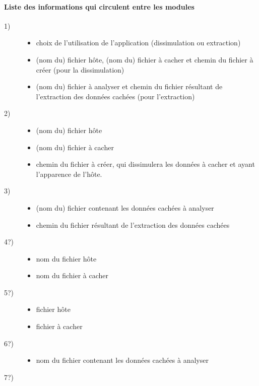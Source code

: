 \documentclass[11pt]{article}
\begin{document}
\paragraph{Liste des informations qui circulent entre les modules}
\begin{description}
\item[1)] 
\begin{itemize}
\item choix de l'utilisation de l'application (dissimulation ou extraction)
\item (nom du) fichier hôte, (nom du) fichier à cacher et chemin du fichier à créer (pour la dissimulation)
\item (nom du) fichier à analyser et chemin du fichier résultant de l'extraction des données cachées (pour l'extraction)
\end{itemize}
\item[2)] 
\begin{itemize}
\item (nom du) fichier hôte 
\item (nom du) fichier à cacher 
\item chemin du fichier à créer, qui dissimulera les données à cacher et ayant l'apparence de l'hôte. 
\end{itemize}
\item[3)] 
\begin{itemize}
\item (nom du) fichier contenant les données cachées à analyser
\item chemin du fichier résultant de l'extraction des données cachées
\end{itemize}
\item[4?)] 
\begin{itemize}
\item nom du fichier hôte 
\item nom du fichier à cacher
\end{itemize}
\item[5?)]
\begin{itemize}
\item fichier hôte
\item fichier à cacher 
\end{itemize}
\item[6?)]
\begin{itemize}
\item nom du fichier contenant les données cachées à analyser 
\end{itemize}
\item[7?)]
\begin{itemize}

\end{itemize}
\end{description}
\end{document}
